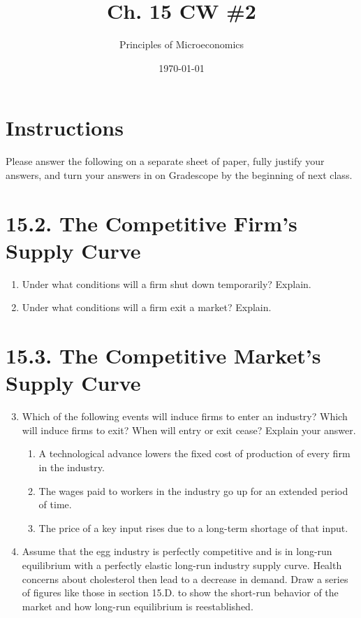 \documentclass{article}
\title{Ch. 15 CW \#2}
\author{Principles of Microeconomics}
\date{\today}
\begin{document}
\maketitle

\section*{Instructions}

Please answer the following on a separate sheet of paper, fully justify your answers, and turn your answers in on Gradescope by the beginning of next class. 

\section*{15.2. The Competitive Firm's Supply Curve}

\begin{enumerate}

\item Under what conditions will a firm shut down temporarily? Explain.

\item Under what conditions will a firm exit a market? Explain.

\end{enumerate}

\section*{15.3. The Competitive Market's Supply Curve}

\begin{enumerate}

\setcounter{enumi}{2}
\item Which of the following events will induce firms to enter an industry? Which will induce firms to exit? When will entry or exit cease? Explain your answer.

	\begin{enumerate}
	
	\item A technological advance lowers the fixed cost of production of every firm in the industry.
	
	\item The wages paid to workers in the industry go up for an extended period of time.
	
	\item The price of a key input rises due to a long-term shortage of that input.
	
	\end{enumerate}
	
\item Assume that the egg industry is perfectly competitive and is in long-run equilibrium with a perfectly elastic long-run industry supply curve. Health concerns about cholesterol then lead to a decrease in demand. Draw a series of figures like those in section 15.D. to show the short-run behavior of the market and how long-run equilibrium is reestablished. 

\end{enumerate}
\end{document}
